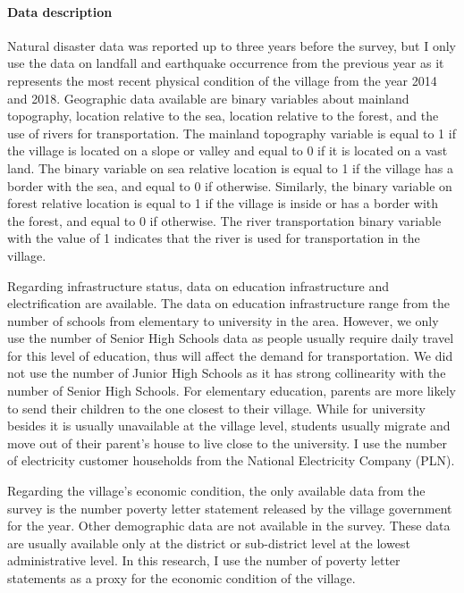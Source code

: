 \documentclass[letterpaper,12pt,leqno]{article}
\begin{document}
\paragraph{Data description} Natural disaster data was reported up to three years before the survey, but I only use the data on landfall and earthquake occurrence from the previous year as it represents the most recent physical condition of the village from the year 2014 and 2018. Geographic data available are binary variables about mainland topography, location relative to the sea, location relative to the forest, and the use of rivers for transportation. The mainland topography variable is equal to 1 if the village is located on a slope or valley and equal to 0 if it is located on a vast land. The binary variable on sea relative location is equal to 1 if the village has a border with the sea, and equal to 0 if otherwise. Similarly, the binary variable on forest relative location is equal to 1 if the village is inside or has a border with the forest, and equal to 0 if otherwise. The river transportation binary variable with the value of 1 indicates that the river is used for transportation in the village.

Regarding infrastructure status, data on education infrastructure and electrification are available. The data on education infrastructure range from the number of schools from elementary to university in the area. However, we only use the number of Senior High Schools data as people usually require daily travel for this level of education, thus will affect the demand for transportation. We did not use the number of Junior High Schools as it has strong collinearity with the number of Senior High Schools. For elementary education, parents are more likely to send their children to the one closest to their village. While for university besides it is usually unavailable at the village level, students usually migrate and move out of their parent's house to live close to the university. I use the number of electricity customer households from the National Electricity Company (PLN).

Regarding the village's economic condition, the only available data from the survey is the number poverty letter statement released by the village government for the year. Other demographic data are not available in the survey. These data are usually available only at the district or sub-district level at the lowest administrative level. In this research, I use the number of poverty letter statements as a proxy for the economic condition of the village.
\end{document}
